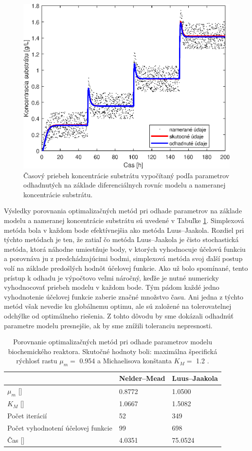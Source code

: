 \begin{figure}
	\centering
	\includegraphics[width=.7\linewidth]{images/param_approx_diff_eq}
	\caption[]{Časový priebeh koncentrácie substrátu vypočítaný podľa parametrov odhadnutých na základe diferenciálnych rovníc modelu a nameranej koncentrácie substrátu.}
	\label{fig:9}
\end{figure}

Výsledky porovnania optimalizačných metód pri odhade parametrov na základe modelu a nameranej koncentrácie substrátu sú uvedené v Tabuľke \ref{tab: 4}. Simplexová metóda bola v každom bode efektívnejšia ako metóda Luus--Jaakola. Rozdiel pri týchto metódach je ten, že zatiaľ čo metóda Luus--Jaakola je čisto stochastická metóda, ktorá náhodne umiestňuje body, v ktorých vyhodnocuje účelovú funkciu a porovnáva ju z predchádzajúcimi bodmi, simplexová metóda svoj ďalší postup volí na základe predošlých hodnôt účelovej funkcie. Ako už bolo spomínané, tento prístup k odhadu je výpočtovo veľmi náročný, keďže je nutné numericky vyhodnocovať priebeh modelu v každom bode. Tým pádom každé jedno vyhodnotenie účelovej funkcie zaberie značné množstvo času. Ani jedna z týchto metód však nevedie ku globálnemu optimu, ale sú založené na tolerovatelnej odchýlke od optimálneho riešenia. Z tohto dôvodu by sme dokázali odhadnúť parametre modelu presnejšie, ak by sme znížili toleranciu nepresnosti.

\begin{table}
	\centering
	\caption{Porovnanie optimalizačných metód pri odhade parametrov modelu biochemického reaktora. Skutočné hodnoty boli: maximálna špecifická rýchlosť rastu $\mu_{m} = $ 0.954  a Michaelisova konštanta $K_{M} = $ 1.2 \unitfrac{\gram}{\liter}.}
	\label{tab: 4}
	\begin{tabular}{lll}
		\hline
		& \textbf{Nelder--Mead} & \textbf{Luus--Jaakola} \\
		\hline
		$\mu_{m}$ [\unitfrac{1}{\hour}] & 0.8772 & 1.0500 \\
		$K_{M}$ [\unitfrac{\gram}{\liter}] & 1.0667 & 1.5082 \\
		Počet iterácií & 52 & 349 \\
		Počet vyhodnotení účelovej funkcie & 99 & 698 \\
		Čas [\second] & 4.0351 & 75.0524 \\
		\hline
	\end{tabular}
\end{table}

